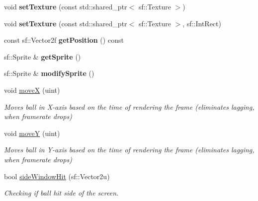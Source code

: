 \begin{DoxyCompactItemize}
\item 
\mbox{\label{class_ball_a4f750fa26a759145e3b04bba05d87711}} 
void {\bfseries set\+Texture} (const std\+::shared\+\_\+ptr$<$ sf\+::\+Texture $>$)
\item 
\mbox{\label{class_ball_af15cbcd2773587b98db326fbc994b7a2}} 
void {\bfseries set\+Texture} (const std\+::shared\+\_\+ptr$<$ sf\+::\+Texture $>$, sf\+::\+Int\+Rect)
\item 
\mbox{\label{class_ball_a672da3b511f6b30fde82a63927fe8174}} 
const sf\+::\+Vector2f {\bfseries get\+Position} () const
\item 
\mbox{\label{class_ball_a2f85e93bd6650f5c5cbf4a0dbd961ca4}} 
sf\+::\+Sprite \& {\bfseries get\+Sprite} ()
\item 
\mbox{\label{class_ball_a06adff7ba12d0971bb9885cf3fbd2950}} 
sf\+::\+Sprite \& {\bfseries modify\+Sprite} ()
\item 
\mbox{\label{class_ball_ab2a08ec563b02d1dcb0b38dcd5429967}} 
void \mbox{\hyperlink{class_ball_ab2a08ec563b02d1dcb0b38dcd5429967}{moveX}} (uint)
\begin{DoxyCompactList}\small\item\em Moves ball in X-\/axis based on the time of rendering the frame (eliminates lagging, when framerate drops) \end{DoxyCompactList}\item 
\mbox{\label{class_ball_a5c833ba1588d41ea4176b6fcffff850e}} 
void \mbox{\hyperlink{class_ball_a5c833ba1588d41ea4176b6fcffff850e}{moveY}} (uint)
\begin{DoxyCompactList}\small\item\em Moves ball in Y-\/axis based on the time of rendering the frame (eliminates lagging, when framerate drops) \end{DoxyCompactList}\item 
\mbox{\label{class_ball_add304c78bcbb5067844d71cb16fc29be}} 
bool \mbox{\hyperlink{class_ball_add304c78bcbb5067844d71cb16fc29be}{side\+Window\+Hit}} (sf\+::\+Vector2u)
\begin{DoxyCompactList}\small\item\em Checking if ball hit side of the screen. \end{DoxyCompactList}\item 

\end{DoxyCompactItemize}
